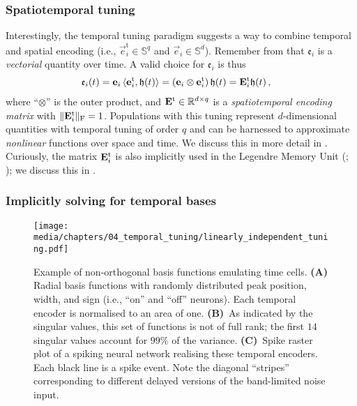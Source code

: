 \subsubsection{Spatiotemporal tuning}
Interestingly, the temporal tuning paradigm suggests a way to combine temporal and spatial encoding (i.e., $\vec{e}_i^\mathrm{t} \in \mathbb{S}^q$ and $\vec{e}_i \in \mathbb{S}^d$).
Remember from  that $\mathfrak{e}_i$ is a \emph{vectorial} quantity over time.
A valid choice for  $\mathfrak{e}_i$ is thus
\begin{align}
	\mathfrak{e}_i(t) &= \mathbf{e}_i \, \langle \mathbf{e}_i^\mathrm{t}, \mathbf{\mathfrak{h}}(t) \rangle = (\mathbf{e}_i \otimes \mathbf{e}_i^\mathrm{t}) \, \mathfrak{h}(t) = \mathbf{E}_i^\mathrm{t} \mathfrak{h}(t)\,,
	\label{eqn:spatio_temporal_encoding_vector}
\end{align}
where \enquote{$\otimes$} is the outer product, and $\mathbf{E}^\mathrm{t} \in \mathbb{R}^{d \times q}$ is a \emph{spatiotemporal encoding matrix} with $\| \mathbf{E}_i^\mathrm{t} \|_\mathrm{F} = 1$.
Populations with this tuning represent $d$-dimensional quantities with temporal tuning of order $q$ and can be harnessed to approximate \emph{nonlinear} functions over space and time.
We discuss this in more detail in .
Curiously, the matrix $\mathbf{E}_i^\mathrm{t}$ is also implicitly used in the Legendre Memory Unit (\LMU; \cite{voelker2019lmu}); we discuss this in .

\subsubsection{Implicitly solving for temporal bases}

\begin{figure}
	\centering
	\texttt{[image: media/chapters/04\_temporal\_tuning/linearly\_independent\_tuning.pdf]}%
	{\label{fig:linearly_independent_tuning_a}}%
	{\label{fig:linearly_independent_tuning_b}}%
	{\label{fig:linearly_independent_tuning_c}}%
	\caption[Example of non-orthogonal basis functions emulating time cells]{Example of non-orthogonal basis functions emulating time cells.
	\textbf{(A)} Radial basis functions with randomly distributed peak position, width, and sign (i.e., \enquote{on} and \enquote{off} neurons).
	Each temporal encoder is normalised to an area of one.
\textbf{(B)}~As indicated by the singular values, this set of functions is not of full rank; the first $14$ singular values account for $99\%$ of the variance.
\textbf{(C)}~Spike raster plot of a spiking neural network realising these temporal encoders. Each black line is a spike event. Note the diagonal \enquote{stripes} corresponding to different delayed versions of the band-limited noise input.
}
	\label{fig:linearly_independent_tuning}
\end{figure}

